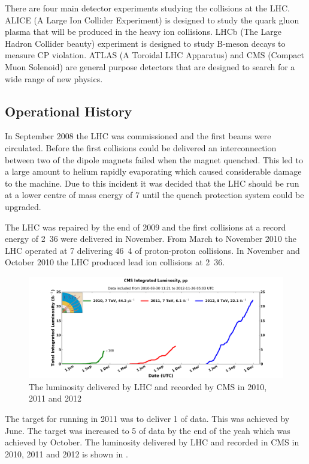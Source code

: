 There are four main detector experiments studying the collisions at the LHC. 
ALICE (A Large Ion Collider Experiment) is designed to study the quark gluon
plasma that will be produced in the heavy ion collisions. 
LHCb (The Large Hadron Collider beauty) experiment is designed to study B-meson
decays to measure CP violation. 
ATLAS (A Toroidal LHC Apparatus) and CMS (Compact Muon Solenoid) are general
purpose detectors that are designed 
to search for a wide range of new physics.\cite{lhc}

\subsection{Operational History}
In September 2008 the LHC was commissioned and the first beams were circulated.
Before the first collisions could be delivered an interconnection
between two of the dipole magnets failed when the magnet quenched.
This led to a large amount to helium rapidly evaporating which caused
considerable damage to the machine.
Due to this incident it was decided that the LHC should be run at a lower centre
of mass energy of \unit{7}{\TeV} until the quench protection system could be
upgraded.

The LHC was repaired by the end of 2009 and the first collisions at a record
energy of \unit{2.36}{\TeV} were delivered in November. 
From March to November 2010 the LHC operated at \unit{7}{\TeV} delivering
\unit{46.4}{\invpb} of proton-proton collisions.
In November and October 2010 the LHC produced lead ion collisions at
\unit{2.36}{\TeV}.

\begin{figure}[htp]
  \centering
  \includegraphics[width=\textwidth]{int_lumi_cumulative_pp_1.png}
  \caption{The luminosity delivered by LHC and recorded by CMS in 2010, 2011 and 2012}
  \label{fig:LHC2010}
\end{figure}


The target for running in 2011 was to deliver \unit{1}{\invfb} of data. This was
achieved by June. The target was increased to \unit{5}{\invfb} of data by the end
of the yeah which was achieved by October.
The luminosity delivered by LHC and recorded in CMS in 2010, 2011 and 2012 is
shown in .

